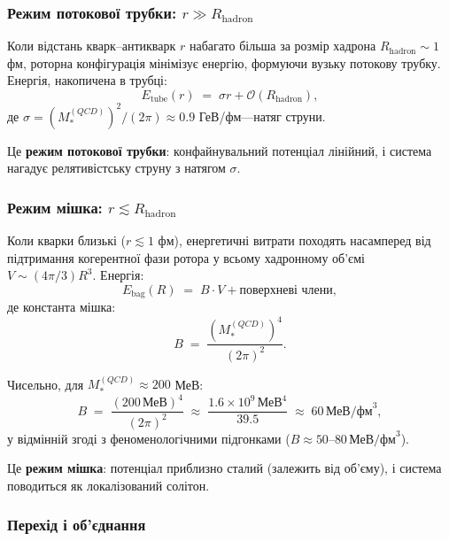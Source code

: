 \documentclass[11pt,a4paper]{article}
\theoremstyle{definition}
\theoremstyle{plain}
\theoremstyle{remark}
\begin{document}
\subsubsection{Режим потокової трубки: $r \gg R_{\mathrm{hadron}}$}

Коли відстань кварк–антикварк $r$ набагато більша за розмір хадрона $R_{\mathrm{hadron}} \sim 1$ фм, роторна конфігурація мінімізує енергію, формуючи вузьку потокову трубку. Енергія, накопичена в трубці:
\begin{equation}
E_{\mathrm{tube}}(r) \;=\; \sigma r + \mathcal{O}(R_{\mathrm{hadron}}),
\end{equation}
де $\sigma = (M_*^{(QCD)})^2 / (2\pi) \approx 0{.}9$ ГеВ/фм—натяг струни.

Це \textbf{режим потокової трубки}: конфайнувальний потенціал лінійний, і система нагадує релятивістську струну з натягом $\sigma$.

\subsubsection{Режим мішка: $r \lesssim R_{\mathrm{hadron}}$}

Коли кварки близькі ($r \lesssim 1$ фм), енергетичні витрати походять насамперед від підтримання когерентної фази ротора у всьому хадронному об'ємі $V \sim (4\pi/3)R^3$. Енергія:
\begin{equation}
E_{\mathrm{bag}}(R) \;=\; B \cdot V + \text{поверхневі члени},
\end{equation}
де константа мішка:
\begin{equation}
B \;=\; \frac{(M_*^{(QCD)})^4}{(2\pi)^2}.
\end{equation}

Чисельно, для $M_*^{(QCD)} \approx 200$ МеВ:
\begin{equation}
B \;=\; \frac{(200\,\text{МеВ})^4}{(2\pi)^2} \;\approx\; \frac{1{.}6 \times 10^9\,\text{МеВ}^4}{39{.}5} \;\approx\; 60\,\text{МеВ/фм}^3,
\end{equation}
у відмінній згоді з феноменологічними підгонками ($B \approx 50$--$80\,\text{МеВ/фм}^3$).

Це \textbf{режим мішка}: потенціал приблизно сталий (залежить від об'єму), і система поводиться як локалізований солітон.

\subsubsection{Перехід і об'єднання}
\end{document}
